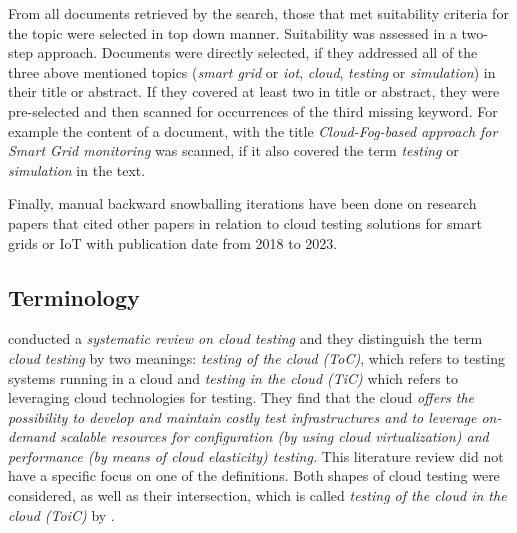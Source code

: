 From all documents retrieved by the search, those that met suitability criteria for the topic were selected in top down manner. Suitability was assessed in a two-step approach. Documents were directly selected, if they addressed all of the three above mentioned topics (\textit{smart grid} or \textit{iot}, \textit {cloud}, \textit{testing} or \textit{simulation}) in their title or abstract. If they covered at least two in title or abstract, they were pre-selected and then scanned for occurrences of the third missing keyword. For example the content of a document, with the title \textit{Cloud-Fog-based approach for Smart Grid monitoring} was scanned, if it also covered the term \textit{testing} or \textit{simulation} in the text. 

Finally, manual backward snowballing iterations have been done on research papers that cited other papers in relation to cloud testing solutions for smart grids or IoT  with publication date from 2018 to 2023.

\subsection{Terminology}
\citeauthor{bertolino2019systematic} conducted a \textit{systematic review on cloud testing} and they distinguish the term \textit{cloud testing} by two meanings: \textit{testing of the cloud (ToC)}, which refers to testing systems running in a cloud and \textit{testing in the cloud (TiC)} which refers to leveraging cloud technologies for testing. They find that the cloud \textit{offers the possibility to develop and maintain costly test infrastructures and to leverage on-demand scalable resources for configuration (by using cloud virtualization) and performance (by means of cloud elasticity) testing.} This literature review did not have a specific focus on one of the definitions. Both shapes of cloud testing were considered, as well as their intersection, which is called \textit{testing of the cloud in the cloud (ToiC)} by \citeauthor{bertolino2019systematic}.



